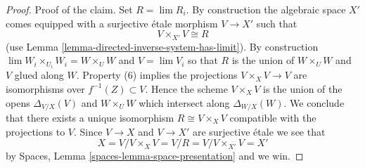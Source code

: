 \begin{proof}
\medskip\noindent
Proof of the claim. Set $R = \lim R_i$.
By construction the algebraic space $X'$ comes
equipped with a surjective \'etale morphism $V \to X'$ such that
$$
V \times_{X'} V \cong R
$$
(use Lemma \ref{lemma-directed-inverse-system-has-limit}).
By construction $\lim W_i \times_{U_i} W_i = W \times_U W$ and $V = \lim V_i$
so that $R$ is the union of $W \times_U W$ and $V$ glued along $W$.
Property (6) implies the projections $V \times_X V \to V$ are isomorphisms
over $f^{-1}(Z) \subset V$. Hence the scheme $V \times_X V$ is the union
of the opens $\Delta_{V/X}(V)$ and $W \times_U W$ which intersect
along $\Delta_{W/X}(W)$. We conclude that there exists a unique isomorphism
$R \cong V \times_X V$ compatible with the projections to $V$.
Since $V \to X$ and $V \to X'$ are surjective \'etale we see that
$$
X = V/ V \times_X V = V/R = V/V \times_{X'} V = X'
$$
by Spaces, Lemma \ref{spaces-lemma-space-presentation} and we win.
\end{proof}